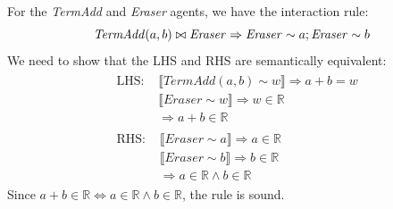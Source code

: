 \begin{lemma}
	For the \textit{TermAdd} and \textit{Eraser} agents, we have the interaction rule:
	$$
	\mathit{TermAdd}(a, b) \bowtie \mathit{Eraser} \Rightarrow \mathit{Eraser} \sim a; \mathit{Eraser} \sim b \\
	$$
	We need to show that the LHS and RHS are semantically equivalent:
	$$
	\begin{aligned}
		& \begin{aligned}
			\text{LHS: } & \llbracket \mathit{TermAdd}(a, b) \sim w \rrbracket \Rightarrow a + b = w \\
			& \llbracket \mathit{Eraser} \sim w \rrbracket \Rightarrow w \in \mathbb{R} \\
			& \Rightarrow a + b \in \mathbb{R}
		\end{aligned} \\
		& \begin{aligned}
			\text{RHS: } & \llbracket \mathit{Eraser} \sim a \rrbracket \Rightarrow a \in \mathbb{R} \\
			& \llbracket \mathit{Eraser} \sim b \rrbracket \Rightarrow b \in \mathbb{R} \\
			& \Rightarrow a \in \mathbb{R} \land b \in \mathbb{R}
		\end{aligned}
	\end{aligned}
	$$
	Since $a + b \in \mathbb{R} \iff a \in \mathbb{R} \land b \in \mathbb{R}$, the rule is sound.
\end{lemma}

